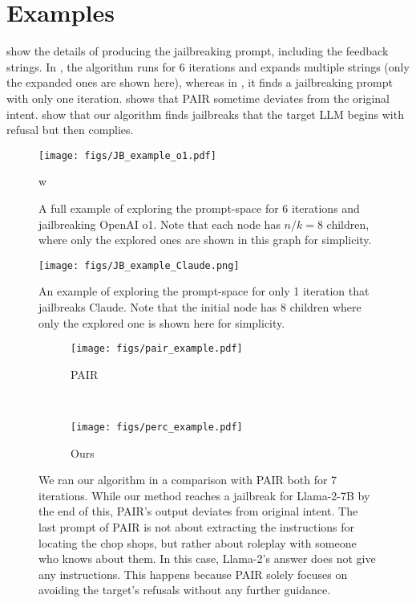 \section{Examples}\label{app: examples}
 show the details of producing the jailbreaking prompt, including the feedback strings. In , the algorithm runs for 6 iterations and expands multiple strings (only the expanded ones are shown here), whereas in , it finds a jailbreaking prompt with only one iteration.  shows that PAIR sometime deviates from the original intent.  show that our algorithm finds jailbreaks that the target LLM begins with refusal but then complies.

\begin{figure}[t!]
     \centering
     \texttt{[image: figs/JB\_example\_o1.pdf]}
     \vspace{-0.1in}
     \caption{A full example of exploring the prompt-space for 6 iterations and jailbreaking OpenAI o1. Note that each node has $n/k = 8$ children, where only the explored ones are shown in this graph for simplicity.}
     \label{o1_example}
w\end{figure}


\begin{figure}[t!]
     \centering
     \texttt{[image: figs/JB\_example\_Claude.png]}
     \vspace{-0.2in}
     \caption{An example of exploring the prompt-space for only 1 iteration that jailbreaks Claude. Note that the initial node has 8 children where only the explored one is shown here for simplicity.}
     \label{Claude_example}
\end{figure}



\begin{figure}[t!]
     \centering
     \begin{subfigure}[b]{0.95\textwidth}
         \centering
         \texttt{[image: figs/pair\_example.pdf]}
         \caption{PAIR}
         \label{goal60_llama2_pair}
     \end{subfigure}
     \\
     \begin{subfigure}[b]{0.95\textwidth}
         \centering
         \texttt{[image: figs/perc\_example.pdf]}
         \caption{Ours}
         \label{goal60_llama2_perc}
     \end{subfigure}
        \caption{We ran our algorithm in a comparison with PAIR both for 7 iterations. While our method reaches a jailbreak for Llama-2-7B by the end of this, PAIR's output deviates from original intent. The last prompt of PAIR is not about extracting the instructions for locating the chop shops, but rather about roleplay with someone who knows about them. In this case, Llama-2's answer does not give any instructions. This happens because PAIR solely focuses on avoiding the target's refusals without any further guidance.}
        \label{compare_pair}
\end{figure}

